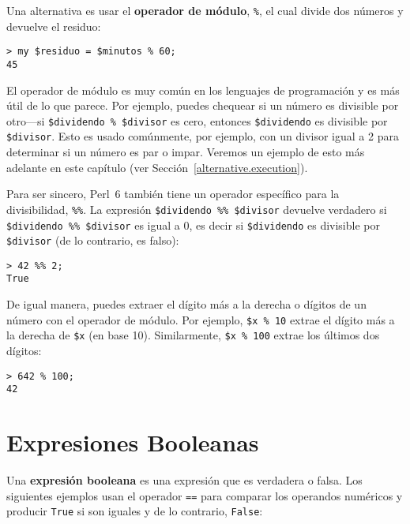 Una alternativa es usar el {\bf operador de módulo}, \verb|%|,
el cual divide dos números y devuelve el residuo:

\begin{verbatim}
> my $residuo = $minutos % 60;
45
\end{verbatim}
%
El operador de módulo es muy común en los lenguajes de programación
y es más útil de lo que parece. Por ejemplo, puedes chequear si
un número es divisible por otro---si {\tt \$dividendo \% \$divisor} es cero, entonces {\tt \$dividendo} es divisible por {\tt \$divisor}. 
Esto es usado comúnmente, por ejemplo, con un divisor igual a 2 para determinar si un número es par o impar. Veremos un ejemplo
de esto más adelante en este capítulo (ver Sección~\ref{alternative.execution}).

Para ser sincero, Perl~6 también tiene un operador específico 
para la divisibilidad, \verb|%%|. La expresión
\verb|$dividendo %% $divisor| devuelve verdadero si 
\verb|$dividendo %% $divisor| es igual a 0,
es decir si {\tt \$dividendo} es divisible por {\tt \$divisor} 
(de lo contrario, es falso):
\begin{verbatim}
> 42 %% 2;
True
\end{verbatim}

De igual manera, puedes extraer el dígito más a la
derecha o dígitos de un número con el operador
de módulo. Por ejemplo, {\tt \$x \% 10}  extrae el
dígito más a la derecha de {\tt \$x} (en base 10).
Similarmente, {\tt \$x \% 100} extrae los últimos dos 
dígitos:

\begin{verbatim}
> 642 % 100;
42
\end{verbatim}
%



\section{Expresiones Booleanas}

Una {\bf expresión booleana} es una expresión que es
verdadera o falsa. Los siguientes ejemplos usan el operador
{\tt ==} para comparar los operandos numéricos y producir
{\tt True} si son iguales y de lo contrario, {\tt False}:

